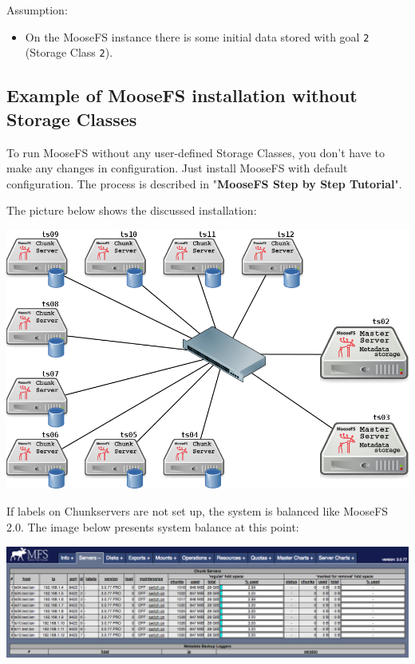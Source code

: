 \documentclass[a4paper,11pt,english]{report}
\def\code#1{\texttt{#1}}
\begin{document}
			Assumption:
			\begin{itemize}
			\item On the MooseFS instance there is some initial data stored with goal \code{2} (Storage Class \code{2}).
			\end{itemize}
			
			\subsection{Example of MooseFS installation without Storage Classes}
			To run MooseFS without any user-defined Storage Classes, you don't have to make any changes in configuration. Just install MooseFS with default configuration. The process is described in "\textbf{MooseFS Step by Step Tutorial}".
			
			The picture below shows the discussed installation:
			
			\bigskip
			\includegraphics[scale=0.5]{images/diagram_without_labels.png}
	
			\pagebreak
			
			If labels on Chunkservers are not set up, the system is balanced like MooseFS 2.0. The image below presents system balance at this point:
			
			\bigskip
			\includegraphics[width=1.0\textwidth]{images/cgi_nolabels.png}
			
\end{document}
